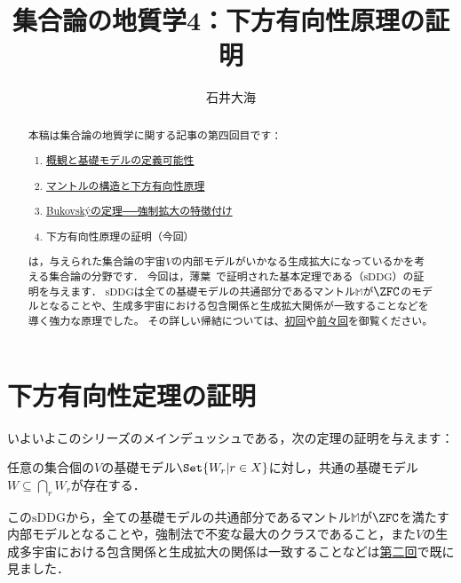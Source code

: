 \documentclass[a4j,leqno]{ltjsarticle}
\title{集合論の地質学4：下方有向性原理の証明}
\author{石井大海}
\renewcommand{\emph}[1]{\textgt{\textsf{#1}}}
\newcommand{\mantle}{\mathbb{M}}
\newcommand{\M}{\mantle}
\newcommand{\sDDG}{\mathord{\mathrm{sDDG}}}
\begin{document}
\maketitle

\begin{abstract}
 本稿は集合論の地質学に関する記事の第四回目です：
 \begin{enumerate}[label={\arabic*.}]
  \item \href{http://konn-san.com/math/geology-ground-definability.html}{概観と基礎モデルの定義可能性}
  \item \href{http://konn-san.com/math/geology-mantle-and-ddg.html}{マントルの構造と下方有向性原理}
  \item \href{http://konn-san.com/math/geology-bukovsky-theorem.html}{Bukovsk\'{y}の定理──強制拡大の特徴付け}
  \item 下方有向性原理の証明（今回）
 \end{enumerate} 
 \emph{集合論の地質学}は，与えられた集合論の宇宙$V$の内部モデルがいかなる生成拡大になっているかを考える集合論の分野です．
 今回は，薄葉~\cite{Usuba:2017fp}で証明された基本定理である\emph{下方有向性原理}（$\mathrm{sDDG}$）の証明を与えます．
 $\mathrm{sDDG}$は全ての基礎モデルの共通部分であるマントル$\mathbb{M}$が$\ZFC$のモデルとなることや、生成多宇宙における包含関係と生成拡大関係が一致することなどを導く強力な原理でした。
 その詳しい帰結については、\href{http://konn-san.com/math/geology-ground-definability.html}{初回}や\href{http://konn-san.com/math/geology-mantle-and-ddg.html}{前々回}を御覧ください。
\end{abstract}
\section{下方有向性定理の証明}
いよいよこのシリーズのメインデュッシュである，次の定理の証明を与えます：
\begin{theorem}
 任意の集合個の$V$の基礎モデル$\Set{W_r | r \in X}$に対し，共通の基礎モデル$W \subseteq \bigcap_r W_r$が存在する．
\end{theorem}
この$\sDDG$から，全ての基礎モデルの共通部分であるマントル$\M$が$\ZFC$を満たす内部モデルとなることや，強制法で不変な最大のクラスであること，また$V$の生成多宇宙における包含関係と生成拡大の関係は一致することなどは\href{http://konn-san.com/math/geology-mantle-and-ddg.html}{第二回}で既に見ました．
\end{document}
